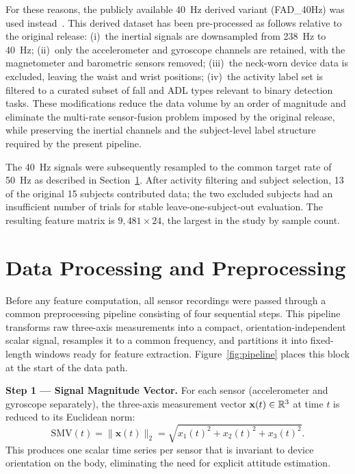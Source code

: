 For these reasons, the publicly available 40~Hz derived variant (FAD\_40Hz) was used instead~\parencite{fallalld}. This derived dataset has been pre-processed as follows relative to the original release: (i)~the inertial signals are downsampled from 238~Hz to 40~Hz; (ii)~only the accelerometer and gyroscope channels are retained, with the magnetometer and barometric sensors removed; (iii)~the neck-worn device data is excluded, leaving the waist and wrist positions; (iv)~the activity label set is filtered to a curated subset of fall and ADL types relevant to binary detection tasks. These modifications reduce the data volume by an order of magnitude and eliminate the multi-rate sensor-fusion problem imposed by the original release, while preserving the inertial channels and the subject-level label structure required by the present pipeline.

The 40~Hz signals were subsequently resampled to the common target rate of 50~Hz as described in Section~\ref{subsec:preprocessing}. After activity filtering and subject selection, 13 of the original 15 subjects contributed data; the two excluded subjects had an insufficient number of trials for stable leave-one-subject-out evaluation. The resulting feature matrix is $9{,}481 \times 24$, the largest in the study by sample count.

\section{Data Processing and Preprocessing}
\label{subsec:preprocessing}

Before any feature computation, all sensor recordings were passed through a common preprocessing pipeline consisting of four sequential steps. This pipeline transforms raw three-axis measurements into a compact, orientation-independent scalar signal, resamples it to a common frequency, and partitions it into fixed-length windows ready for feature extraction. Figure~\ref{fig:pipeline} places this block at the start of the data path.

\textbf{Step 1 --- Signal Magnitude Vector.}
For each sensor (accelerometer and gyroscope separately), the three-axis measurement vector $\mathbf{x}(t) \in \mathbb{R}^3$ at time $t$ is reduced to its Euclidean norm:
\[
  \mathrm{SMV}(t) = \bigl\|\mathbf{x}(t)\bigr\|_2 = \sqrt{x_1(t)^2 + x_2(t)^2 + x_3(t)^2}.
\]
This produces one scalar time series per sensor that is invariant to device orientation on the body, eliminating the need for explicit attitude estimation.

